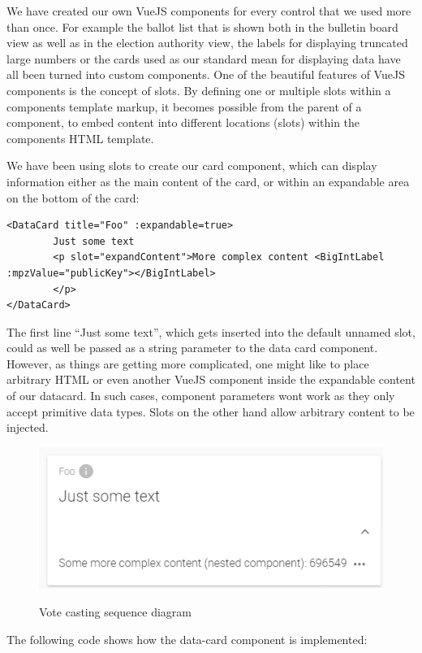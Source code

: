 We have created our own VueJS components for every control that we used more than once. For example the ballot list that is shown both in the bulletin board view as well as in the election authority view, the labels for displaying truncated large numbers or the cards used as our standard mean for displaying data have all been turned into custom components. One of the beautiful features of VueJS components is the concept of slots. By defining one or multiple slots within a components template markup, it becomes possible from the parent of a component, to embed content into different locations (slots) within the components HTML template.

We have been using slots to create our card component, which can display information either as the main content of the card, or within an expandable area on the bottom of the card:

\begin{verbatim} 
<DataCard title="Foo" :expandable=true>
		Just some text
		<p slot="expandContent">More complex content <BigIntLabel :mpzValue="publicKey"></BigIntLabel>
		</p>
</DataCard>
\end{verbatim}
The first line "`Just some text"', which gets inserted into the default unnamed slot, could as well be passed as a string parameter to the data card component. However, as things are getting more complicated, one might like to place arbitrary HTML or even another VueJS component inside the expandable content of our datacard. In such cases, component parameters wont work as they only accept primitive data types. Slots on the other hand allow arbitrary content to be injected.
\begin{figure}[h!]
\begin{center}
\includegraphics[scale=1.0]{assets/datacardexample.PNG}\\
\caption{Vote casting sequence diagram}
\end{center}
\end{figure}
The following code shows how the data-card component is implemented:

